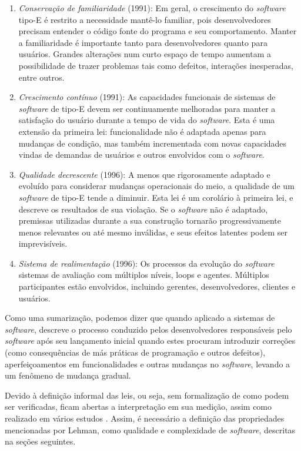 \begin{enumerate}
	\item \textit{Conservação de familiaridade }(1991): Em geral, o crescimento do \textit{software} tipo-E é restrito a necessidade mantê-lo familiar, pois desenvolvedores precisam entender o código fonte do programa e seu comportamento. Manter a familiaridade é importante tanto para desenvolvedores quanto para usuários. Grandes alterações num curto espaço de tempo aumentam a possibilidade de trazer problemas tais como defeitos, interações inesperadas, entre outros.
	\item \textit{Crescimento contínuo }(1991): As capacidades funcionais de sistemas de \textit{software} de tipo-E devem ser continuamente melhoradas para manter a satisfação do usuário durante a tempo de vida do \textit{software}. Esta é uma extensão da primeira lei: funcionalidade não é adaptada apenas para mudanças de condição, mas também incrementada com novas capacidades vindas de demandas de usuários e outros envolvidos com o \textit{software}.
	\item \textit{Qualidade decrescente }(1996): A menos que rigorosamente adaptado e evoluído para considerar mudanças operacionais do meio, a qualidade de um \textit{software} de tipo-E tende a diminuir. Esta lei é um corolário à primeira lei, e descreve os resultados de sua violação. Se o \textit{software} não é adaptado, premissas utilizadas durante a sua construção tornarão progressivamente menos relevantes ou até mesmo inválidas, e seus efeitos latentes podem ser imprevisíveis.
	\item \textit{Sistema de realimentação }(1996): Os processos da evolução do \textit{software} sistemas de avaliação com múltiplos níveis, loops e agentes. Múltiplos participantes estão envolvidos, incluindo gerentes, desenvolvedores, clientes e usuários. 
\end{enumerate}

Como uma sumarização, podemos dizer que quando aplicado a sistemas de \textit{software}, descreve o processo conduzido pelos desenvolvedores responsáveis pelo \textit{software} após seu lançamento inicial quando estes procuram introduzir correções (como consequências de más práticas de programação e outros defeitos), aperfeiçoamentos em funcionalidades e outras mudanças no \textit{software}, levando a um fenômeno de mudança gradual. 

Devido à definição informal das leis, ou seja, sem formalização de como podem ser verificadas, ficam abertas a interpretação em sua medição, assim como realizado em vários estudos \cite{lehman1985program,israeli2010linux,neamtiu2013towards}. Assim, é necessário a definição das propriedades mencionadas por Lehman, como qualidade e complexidade de \textit{software}, descritas na seções seguintes.

